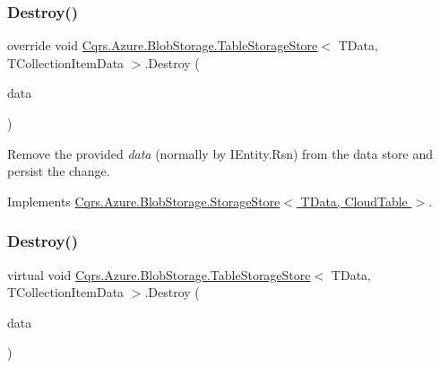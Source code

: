 \subsubsection{\texorpdfstring{Destroy()}{Destroy()}\hspace{0.1cm}{\footnotesize\ttfamily [1/2]}}
{\footnotesize\ttfamily override void \hyperlink{classCqrs_1_1Azure_1_1BlobStorage_1_1TableStorageStore}{Cqrs.\+Azure.\+Blob\+Storage.\+Table\+Storage\+Store}$<$ T\+Data, T\+Collection\+Item\+Data $>$.Destroy (\begin{DoxyParamCaption}\item[{T\+Data}]{data }\end{DoxyParamCaption})\hspace{0.3cm}{\ttfamily [virtual]}}



Remove the provided {\itshape data}  (normally by I\+Entity.\+Rsn) from the data store and persist the change. 



Implements \hyperlink{classCqrs_1_1Azure_1_1BlobStorage_1_1StorageStore_a9879b4ab18c2a33d7e20bc0b3a734195_a9879b4ab18c2a33d7e20bc0b3a734195}{Cqrs.\+Azure.\+Blob\+Storage.\+Storage\+Store$<$ T\+Data, Cloud\+Table $>$}.

\mbox{\label{classCqrs_1_1Azure_1_1BlobStorage_1_1TableStorageStore_a0b408504b9553b9c649b7186a382052a_a0b408504b9553b9c649b7186a382052a}} 
\subsubsection{\texorpdfstring{Destroy()}{Destroy()}\hspace{0.1cm}{\footnotesize\ttfamily [2/2]}}
{\footnotesize\ttfamily virtual void \hyperlink{classCqrs_1_1Azure_1_1BlobStorage_1_1TableStorageStore}{Cqrs.\+Azure.\+Blob\+Storage.\+Table\+Storage\+Store}$<$ T\+Data, T\+Collection\+Item\+Data $>$.Destroy (\begin{DoxyParamCaption}\item[{T\+Collection\+Item\+Data}]{data }\end{DoxyParamCaption})\hspace{0.3cm}{\ttfamily [virtual]}}



